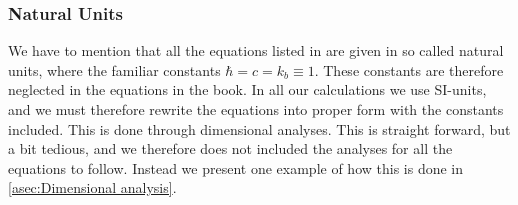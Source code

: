 \documentclass[10pt,a4paper]{article}
\begin{document}
\subsubsection{Natural Units}
\label{subsubsec:Theory/natural units}
We have to mention that all the equations listed in \cite{Dodelson} are given in so called natural units, where the familiar constants $\hbar = c = k_b \equiv 1$. These constants are therefore neglected in the equations in the book. In all our calculations we use SI-units, and we must therefore rewrite the equations into proper form with the constants included. This is done through dimensional analyses. This is straight forward, but a bit tedious, and we therefore does not included the analyses for all the equations to follow. Instead we present one example of how this is done in \cref{asec:Dimensional analysis}.

\end{document}
